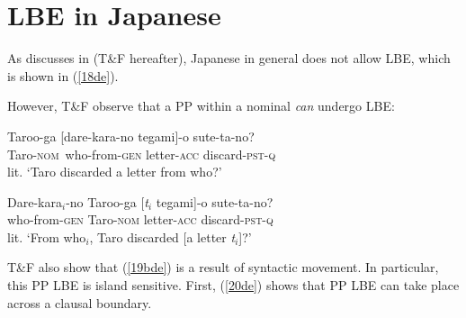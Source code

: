 \documentclass[output=paper]{langscibook}
\begin{document}
\section{LBE in Japanese} \label{s3de}

As discusses in \citet{TakahashiFunakoshi2013} (T\&F hereafter), Japanese in general does not allow LBE, which is shown in (\ref{18de}).

\begin{exe}
\ex \label{18de}
\begin{xlist}

\end{xlist}
\end{exe}

However, T\&F observe that a PP within a nominal \textit{can} undergo LBE: 

\begin{exe}
\ex \label{19de}
\begin{xlist}
\ex \label{19ade}
\gll Taroo-ga   [dare-kara-no    tegami]-o    sute-ta-no?\\
Taro-\textsc{nom} \,who-from-\textsc{gen} letter-\textsc{acc} discard-\textsc{pst}-\textsc{q}\\
\glt lit. ‘Taro discarded a letter from who?’


\ex \label{19bde}
\gll Dare-kara$_{i}$-no   Taroo-ga  [\textit{t}$_{i}$       tegami]-o  sute-ta-no?\\
who-from-\textsc{gen} Taro-\textsc{nom}  {} letter-\textsc{acc} discard-\textsc{pst}-\textsc{q}\\
\glt lit. ‘From who$_{i}$, Taro discarded [a letter \textit{t}$_{i}$]?’
\end{xlist}
\end{exe}

T\&F also show that (\ref{19bde}) is a result of syntactic movement. In particular, this PP LBE is island sensitive. First, (\ref{20de}) shows that PP LBE can take place across a clausal boundary.  
\end{document}
